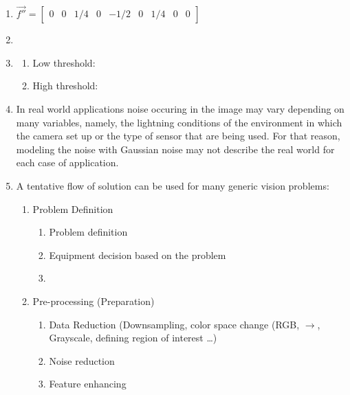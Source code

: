 \documentclass{article}
\begin{document}
\begin{enumerate}
	\item $ \vec{f''} = \begin{bmatrix} 0 & 0 & 1/4 & 0 & -1/2 & 0 & 1/4 & 0 & 0
	\end{bmatrix}$
	\item
	\item %
	\begin{enumerate}
		\item Low threshold: 
		\item High threshold:	
	\end{enumerate}
	\item In real world applications noise occuring in the image may vary
	depending on many variables, namely, the lightning conditions of the
	environment in which the camera set up or the type of sensor that are being
	used. For that reason, modeling the noise with Gaussian noise may not describe
	the real world for each case of application. 
	\item A tentative flow of solution can be used for many generic vision
	problems:
	\begin{enumerate}
		\item Problem Definition
		\begin{enumerate}
			\item Problem definition
			\item Equipment decision based on the problem
			\item 
		\end{enumerate}
		\item Pre-processing (Preparation)
		\begin{enumerate}
			\item Data Reduction (Downsampling, color space change (RGB, $\to$,
			Grayscale, defining region of interest \ldots)
			\item Noise reduction
			\item Feature enhancing 

\end{enumerate}
\end{enumerate}
\end{enumerate}
\end{document}
